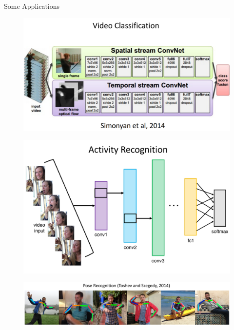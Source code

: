 \documentclass[10pt]{beamer}
\theoremstyle{remark}
\theoremstyle{definition}
\begin{document}
\begin{frame}[allowframebreaks]{Some Applications}
\framebreak

\begin{figure}
\centering
\includegraphics[width=1.0\textwidth,height=0.9\textheight,keepaspectratio]{./images/cv_6.png}
\end{figure}


\framebreak

\begin{figure}
\centering
\includegraphics[width=1.0\textwidth,height=0.9\textheight,keepaspectratio]{./images/cv_7.png}
\end{figure}

\framebreak

\begin{figure}
\centering
\includegraphics[width=1.0\textwidth,height=0.9\textheight,keepaspectratio]{./images/cv_8.png}
\end{figure}


\end{frame}
\end{document}
